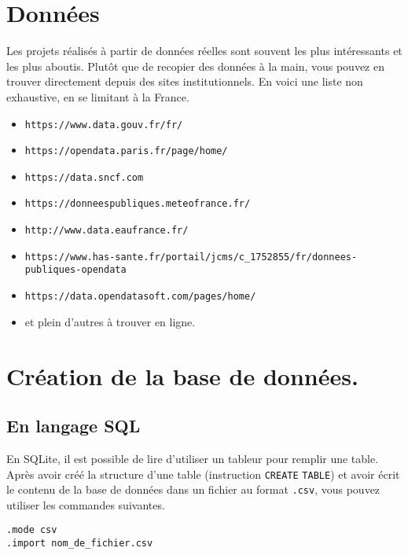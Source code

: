 \section{Données}
Les projets réalisés à partir de données réelles sont souvent les plus intéressants et les plus aboutis.
Plutôt que de recopier des données à la main, vous pouvez en trouver directement depuis des sites institutionnels.
En voici une liste non exhaustive, en se limitant à la France. 
\begin{itemize}
  \item \texttt{https://www.data.gouv.fr/fr/}
  \item \texttt{https://opendata.paris.fr/page/home/}
  \item \texttt{https://data.sncf.com}
  \item \texttt{https://donneespubliques.meteofrance.fr/}
  \item \texttt{http://www.data.eaufrance.fr/}
  \item \texttt{https://www.has-sante.fr/portail/jcms/c\_1752855/fr/donnees-publiques-opendata}
  \item \texttt{https://data.opendatasoft.com/pages/home/}
  \item et plein d'autres à trouver en ligne.
\end{itemize}

\section{Création de la base de données.}

\subsection{En langage SQL}
En SQLite, il est possible de lire d'utiliser un tableur pour remplir une table. 
Après avoir créé la structure d'une table (instruction \texttt{CREATE} \texttt{TABLE}) et avoir écrit le contenu de la base de données dans un fichier au format \texttt{.csv}, vous pouvez utiliser les commandes suivantes. 
\begin{lstlisting}
.mode csv
.import nom_de_fichier.csv
\end{lstlisting}

